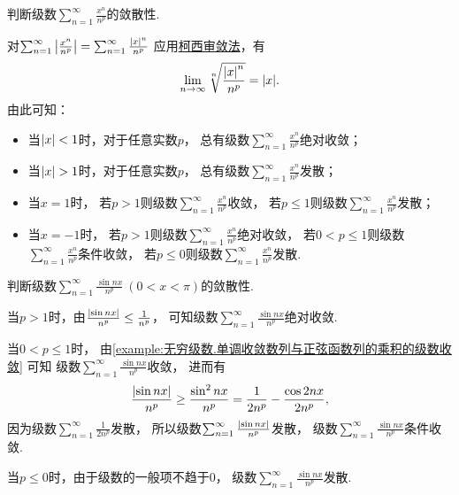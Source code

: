 \begin{example}
判断级数\(\sum_{n=1}^\infty \frac{x^n}{n^p}\)的敛散性.
\begin{solution}
对\(\sum_{n=1}^\infty \abs{\frac{x^n}{n^p}}
= \sum_{n=1}^\infty \frac{\abs{x}^n}{n^p}\)
应用\hyperref[theorem:无穷级数.正项级数的根值审敛法]{柯西审敛法}，有\[
	\lim_{n\to\infty} \sqrt[n]{\frac{\abs{x}^n}{n^p}}
	= \abs{x}.
\]
由此可知：\begin{itemize}
	\item 当\(\abs{x}<1\)时，对于任意实数\(p\)，
	总有级数\(\sum_{n=1}^\infty \frac{x^n}{n^p}\)绝对收敛；

	\item 当\(\abs{x}>1\)时，对于任意实数\(p\)，
	总有级数\(\sum_{n=1}^\infty \frac{x^n}{n^p}\)发散；

	\item 当\(x=1\)时，
	若\(p>1\)则级数\(\sum_{n=1}^\infty \frac{x^n}{n^p}\)收敛，
	若\(p\leq1\)则级数\(\sum_{n=1}^\infty \frac{x^n}{n^p}\)发散；

	\item 当\(x=-1\)时，
	若\(p>1\)则级数\(\sum_{n=1}^\infty \frac{x^n}{n^p}\)绝对收敛，
	若\(0<p\leq1\)则级数\(\sum_{n=1}^\infty \frac{x^n}{n^p}\)条件收敛，
	若\(p\leq0\)则级数\(\sum_{n=1}^\infty \frac{x^n}{n^p}\)发散.
\end{itemize}
\end{solution}
\end{example}

\begin{example}
判断级数\(\sum_{n=1}^\infty \frac{\sin nx}{n^p}\ (0<x<\pi)\)的敛散性.
\begin{solution}
当\(p>1\)时，由\(\frac{\abs{\sin nx}}{n^p} \leq \frac1{n^p}\)，
可知级数\(\sum_{n=1}^\infty \frac{\sin nx}{n^p}\)绝对收敛.

当\(0<p\leq1\)时，
由\cref{example:无穷级数.单调收敛数列与正弦函数列的乘积的级数收敛} 可知
级数\(\sum_{n=1}^\infty \frac{\sin nx}{n^p}\)收敛，
进而有\[
	\frac{\abs{\sin nx}}{n^p}
	\geq \frac{\sin^2nx}{n^p}
	= \frac1{2n^p} - \frac{\cos2nx}{2n^p},
\]
因为级数\(\sum_{n=1}^\infty \frac1{2n^p}\)发散，
所以级数\(\sum_{n=1}^\infty \frac{\abs{\sin nx}}{n^p}\)发散，
级数\(\sum_{n=1}^\infty \frac{\sin nx}{n^p}\)条件收敛.

当\(p\leq0\)时，由于级数的一般项不趋于\(0\)，
级数\(\sum_{n=1}^\infty \frac{\sin nx}{n^p}\)发散.
\end{solution}
\end{example}

